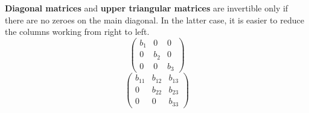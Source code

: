 \documentclass[11pt]{article}
\begin{document}
	\textbf{Diagonal matrices} and \textbf{upper triangular matrices} are invertible only if there are no zeroes on the main diagonal. In the latter case, it is easier to reduce the columns working from right to left.
	\begin{equation}
		\begin{pmatrix}
			b_1 & 0 & 0\\
			0 & b_2 & 0\\
			0 & 0 & b_3
		\end{pmatrix}
	\end{equation}
	\begin{equation}
		\begin{pmatrix}
			b_11 & b_12 & b_13\\
			0 & b_22 & b_23\\
			0 & 0 & b_33
		\end{pmatrix}
	\end{equation}
%		
%		


\end{document}
